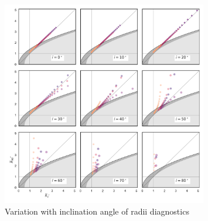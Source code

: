 \begin{figure}
  \centering
  \includegraphics[width=0.8\textwidth]{figs/two-quadric-R90-Rc-snapshots}
  \caption{Variation with inclination angle of radii diagnostics}
  \label{fig:thin-shell-R90-Rc-snapshots}
\end{figure}


